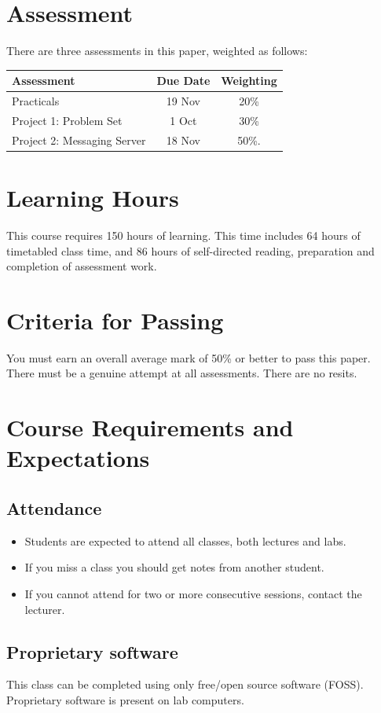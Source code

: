 \documentclass{article}
\begin{document}
\section*{Assessment}
There are three assessments in this paper, weighted as follows:


\begin{tabular}{|l|c|c|}
\hline
Assessment                    & Due Date       & Weighting \\ \hline
Practicals                    & 19 Nov         & 20\% \\ \hline
Project 1: Problem  Set       &  1 Oct         & 30\% \\ \hline
Project 2: Messaging Server   & 18 Nov         & 50\%. \\ \hline
\end{tabular}

\section*{Learning Hours}
This course requires 150 hours of learning. This time includes 64 hours of timetabled class time, and 86 
hours of self-directed reading, preparation and completion of assessment work.


\section*{Criteria for Passing}
You must earn an overall average mark of 50\% or better to pass this paper. There must be a genuine 
attempt at all assessments. There are no resits.

\section*{Course Requirements and Expectations}
\subsection*{Attendance}
\begin{itemize}
 \item Students are expected to attend all classes, both lectures and labs.
 \item If you miss a class you should get notes from another student.
 \item If you cannot attend for two or more consecutive sessions, contact the lecturer.
\end{itemize}

\subsection*{Proprietary software}
This class can be completed using only free/open source software (FOSS). Proprietary software is present on lab computers. 
\end{document}
